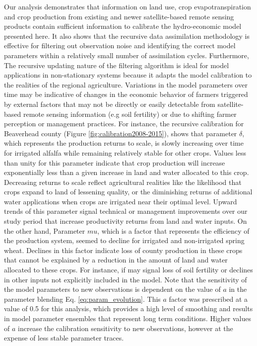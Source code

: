  Our analysis demonstrates that information on land use, crop evapotranspiration and crop production from existing and newer satellite-based remote sensing products contain sufficient information to calibrate the hydro-economic model presented here. It also shows that the recursive data assimilation methodology is effective for filtering out observation noise and identifying the correct model parameters within a relatively small number of assimilation cycles. Furthermore, The recursive updating nature of the filtering algorithm is ideal for model applications in non-stationary systems because it adapts the model calibration to the realities of the regional agriculture. Variations in the model parameters over time may be indicative of changes in the economic behavior of farmers triggered by external factors that may not be directly or easily detectable from satellite-based remote sensing information (e.g soil fertility) or due to shifting farmer perception or management practices. For instance, the recursive calibration for Beaverhead county (Figure \ref{fig:calibration2008-2015}), shows that parameter $\delta$, which represents the production returns to scale, is slowly increasing over time for irrigated alfalfa while remaining relatively stable for other crops. Values less than unity for this parameter indicate that crop production will increase exponentially less than a given increase in land and water allocated to this crop. Decreasing returns to scale reflect agricultural realities like the likelihood that crops expand to land of lessening quality, or the diminishing returns of additional water applications when crops are irrigated near their optimal level. Upward trends of this parameter signal technical or management improvements over our study period that increase productivity returns from land and water inputs. On the other hand, Parameter $mu$, which is a factor that represents the efficiency of the production system, seemed to decline for irrigated and non-irrigated spring wheat. Declines in this factor indicate loss of county production in these crops that cannot be explained by a reduction in the amount of land and water allocated to these crops. For instance, if may signal loss of soil fertility or declines in other inputs not explicitly included in the model. Note that the sensitivity of the model parameters to new observations is dependent on the value of $a$ in the parameter blending Eq. \eqref{eq:param_evolution}. This $a$ factor was prescribed at a value of 0.5 for this analysis, which provides a high level of smoothing and results in model parameter ensembles that represent long term conditions. Higher values of $a$ increase the calibration sensitivity to new observations, however at the expense of less stable parameter traces.
 
